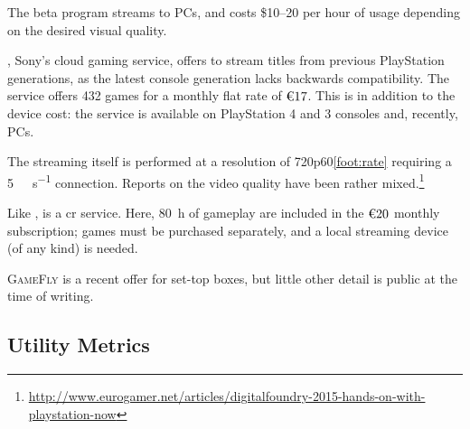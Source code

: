 The \gfnowpc beta program streams to \glspl{PC}, and costs
\$\SIrange{10}{20}{} per hour of usage depending on the desired
visual quality.


\psnow, Sony's cloud gaming service, offers to stream titles from previous
PlayStation generations, as the latest console generation lacks
backwards compatibility.
The service offers 432 games for a monthly flat rate of
$\text{\texteuro}17$.
This is in addition to
the device cost: the service is available on PlayStation 4 and 3
consoles and, recently, \glspl{PC}.


The streaming itself is performed at a resolution of
720p60\cref{foot:rate} requiring a \SI{5}{\mega\bit\per\second}
connection. Reports on the video quality have been rather
mixed.\footnote{\url{http://www.eurogamer.net/articles/digitalfoundry-2015-hands-on-with-playstation-now}}



Like \gfnowpc, \liquid is a \gls{cr} service. Here, \SI{80}{\hour} of
gameplay are included in the $\text{\texteuro}20$ monthly subscription;
games must be purchased separately, and a local streaming device
(of any kind) is needed.

\textsc{GameFly} is a recent offer for set-top boxes, but little
other detail is public at the time of writing.


\subsection{Utility Metrics}

